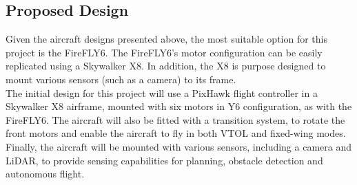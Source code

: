 \subsection{Proposed Design}
Given the aircraft designs presented above, the most suitable option for this project is the FireFLY6. The FireFLY6's motor configuration can be easily replicated using a Skywalker X8. In addition, the X8 is purpose designed to mount various sensors (such as a camera) to its frame.\\

The initial design for this project will use a PixHawk flight controller in a Skywalker X8 airframe, mounted with six motors in Y6 configuration, as with the FireFLY6. The aircraft will also be fitted with a transition system, to rotate the front motors and enable the aircraft to fly in both VTOL and fixed-wing modes. Finally, the aircraft will be mounted with various sensors, including a camera and LiDAR, to provide sensing capabilities for planning, obstacle detection and autonomous flight.